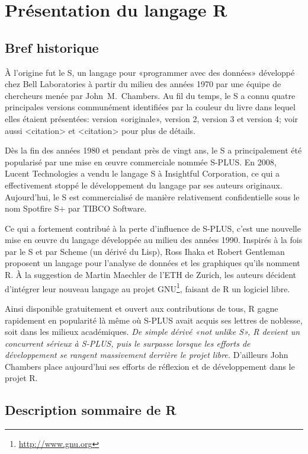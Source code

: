 \documentclass[11pt,article,french]{memoir}
\begin{document}
\chapter{Présentation du langage R}
\label{chap:rpresentation}

\section{Bref historique}
\label{sec:rpresentation:historique}

À l'origine fut le S, un langage pour «programmer avec des données»
développé chez Bell Laboratories à partir du milieu des années 1970
par une équipe de chercheurs menée par John~M.\ Chambers. Au fil du
temps, le S a connu quatre principales versions communément
identifiées par la couleur du livre dans lequel elles étaient
présentées: %
version «originale», %
version 2, %
version 3 et %
version 4; %
voir aussi <citation> et <citation> pour plus de détails.

Dès la fin des années 1980 et pendant près de vingt ans, le S a
principalement été popularisé par une mise en {\oe}uvre commerciale
nommée S-PLUS. En 2008, Lucent Technologies a vendu le langage S à
Insightful Corporation, ce qui a effectivement stoppé le développement
du langage par ses auteurs originaux. Aujourd'hui, le S est
commercialisé de manière relativement confidentielle sous le nom
Spotfire S$+$ par TIBCO Software.

Ce qui a fortement contribué à la perte d'influence de S-PLUS, c'est
une nouvelle mise en {\oe}uvre du langage développée au milieu des
années 1990. Inspirés à la fois par le S et par Scheme (un dérivé du
Lisp), Ross Ihaka et Robert Gentleman proposent un langage pour
l'analyse de données et les graphiques qu'ils nomment R. À la
suggestion de Martin Maechler de l'ETH de Zurich, les auteurs décident
d'intégrer leur nouveau langage au projet GNU\footnote{%
  \url{http://www.gnu.org}}, %
faisant de R un logiciel libre.

Ainsi disponible gratuitement et ouvert aux contributions de tous,
R gagne rapidement en popularité là même où S-PLUS avait acquis ses
lettres de noblesse, soit dans les milieux académiques. \emph{De simple
dérivé «\emph{not unlike S}», R devient un concurrent sérieux à
S-PLUS, puis le surpasse lorsque les efforts de développement se
rangent massivement derrière le projet libre.} D'ailleurs John Chambers
place aujourd'hui ses efforts de réflexion et de développement dans le
projet R.


\section{Description sommaire de R}
\label{sec:rpresentation:description}
\end{document}
